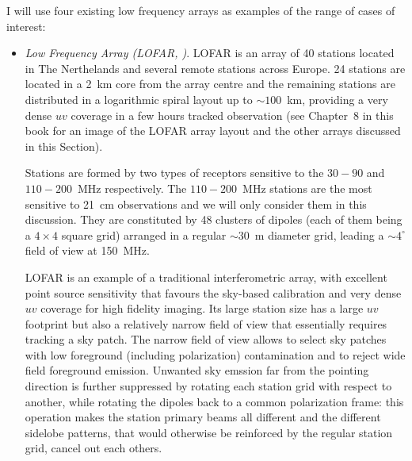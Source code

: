 {I will use four existing low frequency arrays as examples of the range of cases of interest:
\begin{itemize}

\item {\it Low Frequency Array (LOFAR, \cite{vanhaarlem13})}. LOFAR is an array of 40 stations located in The Nerthelands and several remote stations across Europe. 24 stations are located in a 2~km core from the array centre and the remaining stations are distributed in a logarithmic spiral layout up to $\sim 100$~km, providing a very dense $uv$ coverage in a few hours tracked observation (see Chapter~8 in this book for an image of the LOFAR array layout and the other arrays discussed in this Section).

Stations are formed by two types of receptors sensitive to the $30-90$ and $110-200$~MHz respectively. The $110-200$~MHz stations are the most sensitive to 21~cm observations and we will only consider them in this discussion. They are constituted by 48 clusters of dipoles (each of them being a $4 \times 4$ square grid) arranged in a regular $\sim 30$~m diameter grid, leading a $\sim 4^\circ$ field of view at 150~MHz.

LOFAR is an example of a traditional interferometric array, with excellent point source sensitivity that favours the sky-based calibration and very dense $uv$ coverage for high fidelity imaging. Its large station size has a large $uv$ footprint but also a relatively narrow field of view that essentially requires tracking a sky patch. The narrow field of view allows to select sky patches with low foreground (including polarization) contamination and to reject wide field foreground emission. Unwanted sky emssion far from the pointing direction is further suppressed by rotating each station grid with respect to another, while rotating the dipoles back to a common polarization frame: this operation makes the station primary beams all different and the different sidelobe patterns, that would otherwise be reinforced by the regular station grid, cancel out each others.


\end{itemize}}

